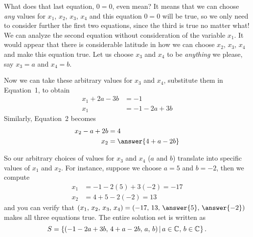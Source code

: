 \documentclass{ximera}
\begin{document}
\begin{example}
  \begin{question}
    What does that last equation, $0=0$, even mean?  It means that we
    can choose \textit{any} values for $x_1$, $x_2$, $x_3$, $x_4$ and
    this equation $0=0$ will be true, so we only need to consider
    further the first two equations, since the third is true no matter
    what!  We can analyze the second equation without consideration of
    the variable $x_1$.  It would appear that there is considerable
    latitude in how we can choose $x_2$, $x_3$, $x_4$ and make this
    equation true.  Let us choose $x_3$ and $x_4$ to be
    \textit{anything} we please, say $x_3=a$ and $x_4=b$.

    Now we can take these arbitrary values for $x_3$ and $x_4$, substitute them in Equation~1, to obtain
    \begin{align*}
      x_1+2a - 3b&= -1\\
      x_1&=-1-2a+3b
    \end{align*}
    Similarly, Equation~2 becomes
    \begin{align*}
      x_2-a+2b&=4\\
      x_2&=\answer{4 +a -2 b}
    \end{align*}
  \end{question}
  
  \begin{question}
    So our arbitrary choices of values for $x_3$ and $x_4$ ($a$ and
    $b$) translate into specific values of $x_1$ and $x_2$.  For
    instance, suppose we choose $a=5$ and $b=-2$, then we compute
    \begin{align*}
      x_1&=-1-2(5)+3(-2)=-17\\
      x_2&=4+5-2(-2)=13
    \end{align*}
    and you can verify that $(x_1,\,x_2,\,x_3,\,x_4)=(-17,\,13,\,\answer{5},\,\answer{-2})$ makes all three equations true.  The entire solution set is written as
    \[
      S=\setparts{(-1-2a+3b,\,4 +a-2b,\,a,\,b)}{ a\in\complex{\null},\,b\in\complex{\null}}.
    \]
  \end{question}
\end{example}
\end{document}
